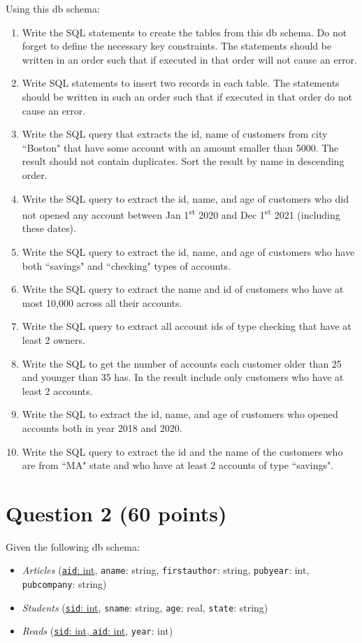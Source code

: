 \documentclass[letterpaper, 11pt]{article}
\begin{document}
Using this db schema:
\begin{enumerate}[label={\alph*}),leftmargin=*]
    \item Write the SQL statements to create the tables from this db schema. Do not forget to define the necessary key constraints. The statements should be written in an order such that if executed in that order will not cause an error.
    \item Write SQL statements to insert two records in each table. The statements should be written in such an order such that if executed in that order do not cause an error.
    \item Write the SQL query that extracts the id, name of customers from city ``Boston" that have some account with an amount smaller than 5000.  The result should not contain duplicates. Sort the result by name in descending order.
    \item Write the SQL query to extract the id, name, and age of customers who did not opened any account between Jan 1\textsuperscript{st} 2020 and Dec 1\textsuperscript{st} 2021 (including these dates).
    \item Write the SQL query to extract the id, name, and age of customers who have both ``savings" and ``checking" types of accounts.
    \item Write the SQL query to extract the name and id of customers who have at most 10,000 across all their accounts.
    \item Write the SQL query to extract all account ids of type checking that have at least 2 owners.
    \item Write the SQL to get the number of accounts each customer older than 25 and younger than 35 has. In the result include only customers who have at least 2 accounts.
    \item Write the SQL to extract the id, name, and age of customers who opened accounts both in year 2018 and 2020.
    \item Write the SQL query to extract the id and the name of the customers who are from ``MA" state and who have at least 2 accounts of type ``savings". 
\end{enumerate}

\section*{Question 2 (60 points)}

Given the following db schema:
\begin{itemize}
    \item \textit{Articles} (\ul{\texttt{aid}: int}, \texttt{aname}: string, \texttt{first\textunderscore author}: string, \texttt{pubyear}: int, \texttt{pubcompany}: string)
    \item \textit{Students} (\ul{\texttt{sid}: int}, \texttt{sname}: string, \texttt{age}: real, \texttt{state}: string)
    \item \textit{Reads} (\ul{\texttt{sid}: int, \texttt{aid}: int}, \texttt{year}: int) 
\end{itemize}
\end{document}
